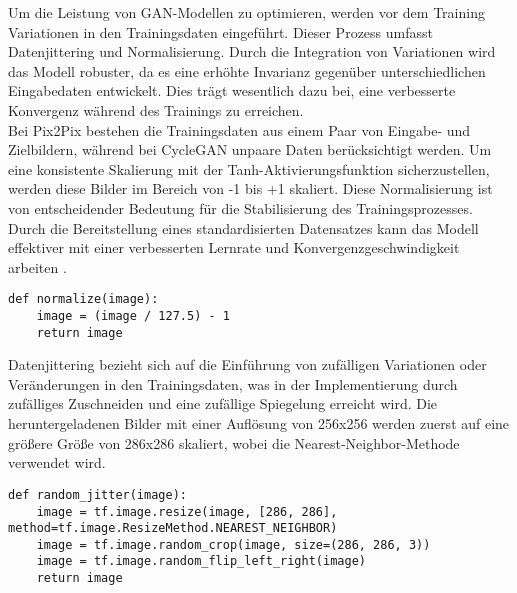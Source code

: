 Um die Leistung von GAN-Modellen zu optimieren, werden vor dem Training Variationen in den Trainingsdaten eingeführt. Dieser Prozess umfasst Datenjittering und Normalisierung. Durch die Integration von Variationen wird das Modell robuster, da es eine erhöhte Invarianz gegenüber unterschiedlichen Eingabedaten entwickelt. Dies trägt wesentlich dazu bei, eine verbesserte Konvergenz während des Trainings zu erreichen.
\\\newline
Bei Pix2Pix bestehen die Trainingsdaten aus einem Paar von Eingabe- und Zielbildern, während bei CycleGAN unpaare Daten berücksichtigt werden. Um eine konsistente Skalierung mit der Tanh-Aktivierungsfunktion sicherzustellen, werden diese Bilder im Bereich von -1 bis +1 skaliert. Diese Normalisierung ist von entscheidender Bedeutung für die Stabilisierung des Trainingsprozesses. Durch die Bereitstellung eines standardisierten Datensatzes kann das Modell effektiver mit einer verbesserten Lernrate und Konvergenzgeschwindigkeit arbeiten \cite{Radford.2015}.

\begin{lstlisting}[language=pyhaff, caption={Vorverarbeitung des Datensatzes: Normalisierung}, label={cod:normalizing}]
def normalize(image):
    image = (image / 127.5) - 1
    return image
\end{lstlisting}

Datenjittering bezieht sich auf die Einführung von zufälligen Variationen oder Veränderungen in den Trainingsdaten, was in der Implementierung durch zufälliges Zuschneiden und eine zufällige Spiegelung erreicht wird. Die heruntergeladenen Bilder mit einer Auflösung von 256x256 werden zuerst auf eine größere Größe von 286x286 skaliert, wobei die Nearest-Neighbor-Methode verwendet wird. 

\begin{lstlisting}[language=pyhaff, caption={Vorverarbeitung des Datensatzes: Jittering}, label={cod:jittering}]
def random_jitter(image):
    image = tf.image.resize(image, [286, 286], method=tf.image.ResizeMethod.NEAREST_NEIGHBOR)
    image = tf.image.random_crop(image, size=(286, 286, 3))
    image = tf.image.random_flip_left_right(image)
    return image
\end{lstlisting}

